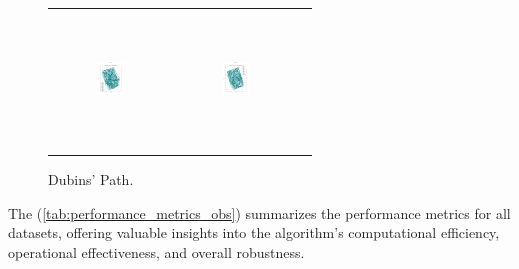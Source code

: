 \begin{figure}[htbp]
\begin{tabular}{ccc}
        \includegraphics[height=36mm,width=0.24\textwidth]{Images/simulation_obs/obs_dubins/4.png}
        & \includegraphics[height=36mm,width=0.24\textwidth]{Images/simulation_obs/obs_dubins/5.png} 

    \end{tabular}
    \caption{Dubins' Path.\label{fig:dubins_path_obs}}
\end{figure}

\vspace{3mm}  

The (\autoref{tab:performance_metrics_obs}) summarizes the performance metrics for all datasets, offering valuable insights into the algorithm's computational efficiency, operational effectiveness, and overall robustness.

